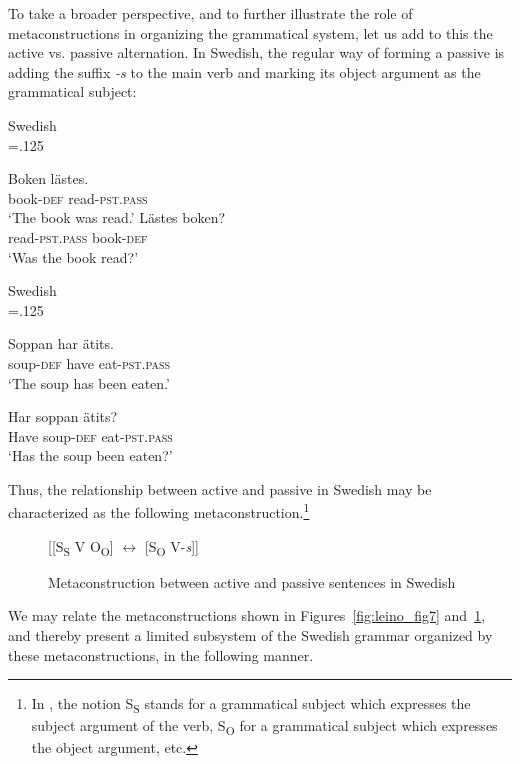 \documentclass[output=paper, colorlinks,citecolor=brown]{langsci/langscibook}
\begin{document}
To take a broader perspective, and to further illustrate the role of metaconstructions in organizing the grammatical system, let us add to this the active vs. passive alternation. In Swedish, the regular way of forming a passive is adding the suffix \textit{{}-s} to the main verb and marking its object argument as the grammatical subject:\largerpage

\ea\label{ex:leino_10}
{Swedish}\\\multicolsep=.125\baselineskip
\begin{multicols}{2}
\ea
\gll Boken       lästes.\\
     book-\textsc{def}  read-\textsc{pst.pass}\\
\glt `The book was read.'
\ex\label{ex:leino_10b}
\gll Lästes              boken?\\
     read-\textsc{pst.pass}  book-\textsc{def}\\
\glt `Was the book read?'
\z\end{multicols}
\ex\label{ex:leino_11}
{Swedish}\\\multicolsep=.125\baselineskip
\begin{multicols}{2}
\ea
\gll Soppan     har    ätits.\\
     soup-\textsc{def}  have  eat-\textsc{pst.pass}\\
\glt `The soup has been eaten.'

\ex\label{ex:leino_11b}
\gll Har    soppan     ätits?\\
     Have  soup-\textsc{def}  eat-\textsc{pst.pass}\\
\glt `Has the soup been eaten?'
\z
\end{multicols}
\z

Thus, the relationship between active and passive in Swedish may be characterized as the following metaconstruction.\footnote{In , the notion S\textsubscript{S} stands for a grammatical subject which expresses the subject argument of the verb, S\textsubscript{O} for a grammatical subject which expresses the object argument, etc.}

\begin{figure}{}
         [[S\textsubscript{S} V O\textsubscript{O}] $\leftrightarrow $ [S\textsubscript{O} V-\textit{s}]]
        \caption{Metaconstruction between active and passive sentences in Swedish\label{fig:leino_fig8}}
\end{figure}

We may relate the metaconstructions shown in Figures~\ref{fig:leino_fig7} and~\ref{fig:leino_fig8}, and thereby present a limited subsystem of the Swedish grammar organized by these metaconstructions, in the following manner.
\end{document}
